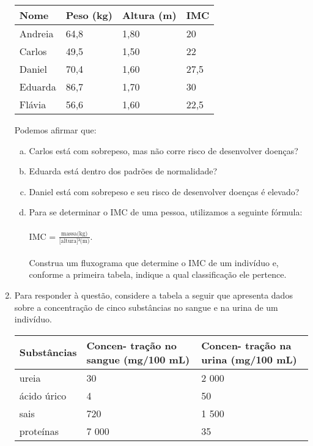 \documentclass[a4paper,14pt]{article}
\begin{document}
\begin{multicols}{2}
\begin{enumerate}
\begin{table}[H]
				\begin{tabular}{|p{1.6cm}|p{1.6cm}|p{1.6cm}|p{1.6cm}|}
					\hline
					\textbf{Nome} & \textbf{Peso (kg)} & \textbf{Altura (m)} & \textbf{IMC} \\ \hline
					Andreia   & 64,8   & 1,80 & 20  \\ \hline
					Carlos   & 49,5   & 1,50 & 22  \\ \hline
					Daniel   & 70,4   & 1,60 & 27,5 \\ \hline
					Eduarda   & 86,7   & 1,70 & 30   \\ \hline
					Flávia   & 56,6  & 1,60 & 22,5   \\ \hline
				\end{tabular}
			\end{table}
			Podemos afirmar que:
			\begin{enumerate}[a)]
				\item Carlos está com sobrepeso, mas não corre risco de desenvolver doenças?
				\item Eduarda está dentro dos padrões de normalidade?
				\item Daniel está com sobrepeso e seu risco de desenvolver doenças é elevado?
				\item Para se determinar o IMC de uma pessoa, utilizamos a seguinte fórmula: \\\\ IMC = $\frac{\text{massa(kg)}}{\text{[altura]²(m)}}$. \\\\ Construa um fluxograma que determine o IMC de um indivíduo e, conforme a primeira tabela, indique a qual classificação ele pertence. \newpage
			\end{enumerate}
			\item Para responder à questão, considere a tabela a seguir que apresenta dados sobre a concentração de cinco substâncias no sangue e na urina de um indivíduo.
			\begin{table}[H]
				\begin{tabular}{|p{2.8cm}|p{2.2cm}|p{2.2cm}|}
					\hline
					\textbf{Substâncias} & \textbf{Concen- tração no sangue (mg/100 mL)} & \textbf{Concen- tração na urina (mg/100 mL)} \\ \hline
					ureia & 30 & 2 000 \\ \hline
					ácido úrico & 4 & 50 \\ \hline
					sais & 720 & 1 500 \\ \hline
					proteínas & 7 000 & 35 \\ \hline

\end{tabular}
\end{table}
\end{enumerate}
\end{multicols}
\end{document}

